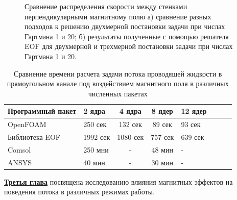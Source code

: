 \begin{figure}[h!]
	\caption{Сравнение распределения скорости между стенками перпендикулярными магнитному полю а) сравнение разных подходов к решению двухмерной постановки задачи при числах Гартмана 1 и 20; б) результаты полученные с помощью решателя EOF для двухмерной и трехмерной постановки задачи при числах Гартмана 1 и 20.}
	\label{fig:comparision}
	
\end{figure}

\begin{table}
	\centering
	\captionsetup{justification=centering}
	\caption{Сравнение времени расчета задачи потока проводящей жидкости в прямоугольном канале под воздействием магнитного поля в различных численных пакетах}
	\begin{tabular}{llccllcc}
		\toprule	
			Программный пакет & 2 ядра        & 4 ядра       & 8  ядер    & 12   ядер  \\
			\midrule
			OpenFOAM                       & 250 сек  & 132 сек  & 89 сек  & 93 сек  \\ \hline
			Библиотека EOF                 & 1992 сек & 1080 сек & 757 сек & 639 сек \\ \hline
			Comsol                         & 250  мни & -        & 48 мин  & -       \\ \hline
			ANSYS                          & 40 мин   & -        & 30 мин  & -       \\ \hline
	\end{tabular}
\label{tab:comparision}
\end{table}



\underline{\textbf{Третья глава}} посвящена исследованию влияния магнитных эффектов на поведения потока в различных режимах работы. 




